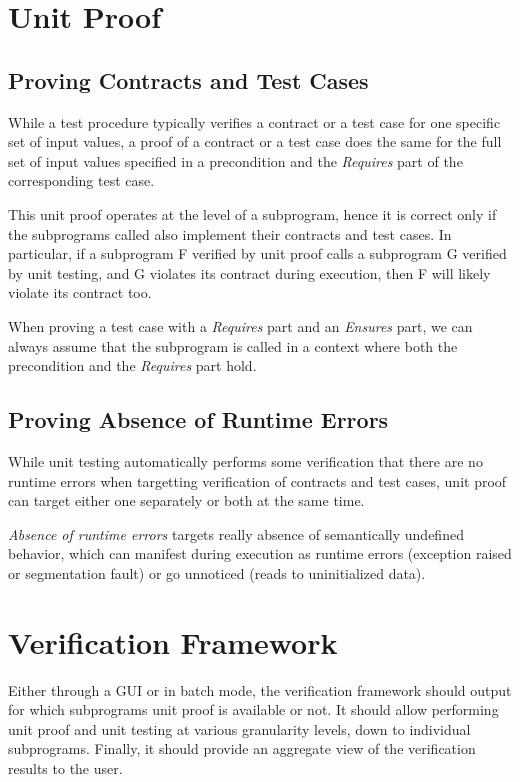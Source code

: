 \documentclass{article}
\begin{document}
\section{Unit Proof}

\subsection{Proving Contracts and Test Cases}

While a test procedure typically verifies a contract or a test case for one
specific set of input values, a proof of a contract or a test case does the
same for the full set of input values specified in a precondition and the
\textit{Requires} part of the corresponding test case.

This unit proof operates at the level of a subprogram, hence it is correct only
if the subprograms called also implement their contracts and test cases. In
particular, if a subprogram F verified by unit proof calls a subprogram G
verified by unit testing, and G violates its contract during execution, then F
will likely violate its contract too.

When proving a test case with a \textit{Requires} part and an \textit{Ensures}
part, we can always assume that the subprogram is called in a context where
both the precondition and the \textit{Requires} part hold.

\subsection{Proving Absence of Runtime Errors}

While unit testing automatically performs some verification that there are no
runtime errors when targetting verification of contracts and test cases, unit
proof can target either one separately or both at the same time.

\textit{Absence of runtime errors} targets really absence of semantically
undefined behavior, which can manifest during execution as runtime errors
(exception raised or segmentation fault) or go unnoticed (reads to
uninitialized data).

\section{Verification Framework}

Either through a GUI or in batch mode, the verification framework should output
for which subprograms unit proof is available or not. It should allow
performing unit proof and unit testing at various granularity levels, down to
individual subprograms. Finally, it should provide an aggregate view of the
verification results to the user.
\end{document}
